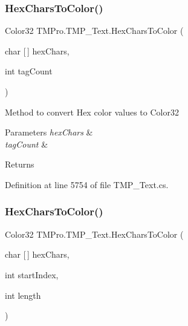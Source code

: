 \subsubsection{\texorpdfstring{HexCharsToColor()}{HexCharsToColor()}\hspace{0.1cm}{\footnotesize\ttfamily [1/2]}}
{\footnotesize\ttfamily Color32 T\+M\+Pro.\+T\+M\+P\+\_\+\+Text.\+Hex\+Chars\+To\+Color (\begin{DoxyParamCaption}\item[{char \mbox{[}$\,$\mbox{]}}]{hex\+Chars,  }\item[{int}]{tag\+Count }\end{DoxyParamCaption})\hspace{0.3cm}{\ttfamily [protected]}}



Method to convert Hex color values to Color32 


\begin{DoxyParams}{Parameters}
{\em hex\+Chars} & \\
\hline
{\em tag\+Count} & \\
\hline
\end{DoxyParams}
\begin{DoxyReturn}{Returns}

\end{DoxyReturn}


Definition at line 5754 of file T\+M\+P\+\_\+\+Text.\+cs.

\mbox{\label{class_t_m_pro_1_1_t_m_p___text_ad2767b714fe3dab5354427dc493a3563}} 
\subsubsection{\texorpdfstring{HexCharsToColor()}{HexCharsToColor()}\hspace{0.1cm}{\footnotesize\ttfamily [2/2]}}
{\footnotesize\ttfamily Color32 T\+M\+Pro.\+T\+M\+P\+\_\+\+Text.\+Hex\+Chars\+To\+Color (\begin{DoxyParamCaption}\item[{char \mbox{[}$\,$\mbox{]}}]{hex\+Chars,  }\item[{int}]{start\+Index,  }\item[{int}]{length }\end{DoxyParamCaption})\hspace{0.3cm}{\ttfamily [protected]}}



